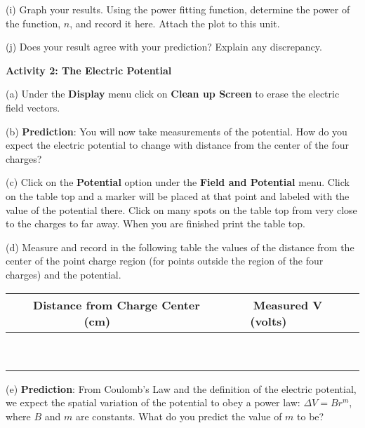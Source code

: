 (i) Graph your results. Using the power fitting
function, determine the power of the function, $n$, and record it here.
Attach the plot to this unit.
\answerspace{15mm}

(j) Does your result agree with your prediction? Explain any discrepancy.\vspace{15mm}

\textbf{Activity 2: The Electric Potential}

(a) Under the {\bf Display} menu click on {\bf Clean up Screen} to erase the
electric field vectors.

(b) \textbf{Prediction}: You will now take measurements of the potential.
How do you expect the electric potential to change with distance from the center of the four charges?
\answerspace{15mm}
 
(c) Click on the \textbf{Potential} option under the \textbf{Field and Potential} menu. Click on the table top and a marker will be
placed at that point and labeled with the value of the potential there.
Click on many spots on the table top from very close to the charges to
far away.
When you are finished print the table top.
\answerspace{15mm}

\pagebreak
(d) Measure and record in the following table the values of the distance from the center of the point charge region (for points outside the region of the four charges) and the potential.

\vspace{0.3cm}
{\centering \begin{tabular}{|c|c|c|}
\hline 
~~~Distance from Charge Center (cm)~~~&
~~~Measured V (volts)~~~\\
\hline
\hline 
&
\\
\hline 
&
\\
\hline 
&
\\
\hline 
&
\\
\hline 
&
\\
\hline 
&
\\
\hline 
&
\\
\hline 
&
\\
\hline 
&
\\
\hline
\end{tabular}\par}
\vspace{0.3cm}


(e) \textbf{Prediction}: From Coulomb's Law and the definition of the
electric potential, we expect the spatial variation of the potential
to obey a power law: \( \Delta V=Br^{m} \), where \( B \)
and \( m \) are constants. What do you predict the value of \textbf{\( m \)}
to be?\vspace{20mm}


